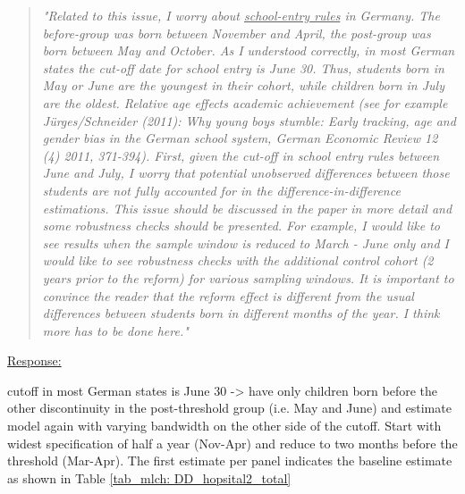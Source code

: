 \begin{quote}
	\textit{"Related to this issue, I worry about \underline{school-entry rules} in Germany. The before-group was born between November and April, the post-group was born between May and October. As I understood correctly, in most German states the cut-off date for school entry is June 30. Thus, students born in May or June are the youngest in their cohort, while children born in July are the oldest. Relative age effects academic achievement (see for example Jürges/Schneider (2011): Why young boys stumble: Early tracking, age and gender bias in the German school system, German Economic Review 12 (4) 2011, 371-394). First, given the cut-off in school entry rules between June and July, I worry that potential unobserved differences between those students are not fully accounted for in the difference-in-difference estimations. This issue should be discussed in the paper in more detail and some robustness checks should be presented. For example, I would like to see results when the sample window is reduced to March - June only and I would like to see robustness checks with the additional control cohort (2 years prior to the reform) for various sampling windows. It is important to convince the reader that the reform effect is different from the usual differences between students born in different months of the year. I think more has to be done here."}
\end{quote}
\underline{Response:}





cutoff in most German states is June 30 -> have only children born before the other discontinuity in the post-threshold group (i.e. May and June) and estimate model again with varying bandwidth on the other side of the cutoff. Start with widest specification of half a year (Nov-Apr) and reduce to two months before the threshold (Mar-Apr). The first estimate per panel indicates the baseline estimate as shown in Table \ref{tab_mlch: DD_hopsital2_total}



